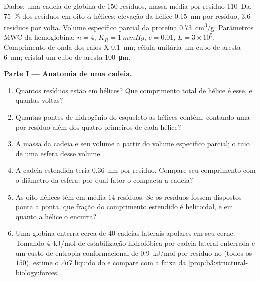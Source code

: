 \begin{problem}
\label{pb:b3:structural-biology:1}
Dados: uma cadeia de globina de $150$ resíduos, massa média por resíduo
\qty{110}{Da}, \qty{75}{\%} dos resíduos em oito $\alpha$-hélices;
elevação da hélice \qty{0.15}{nm} por resíduo, $3.6$ resíduos por
volta. Volume específico parcial da proteína \qty{0.73}{cm^3/g}.
Parâmetros MWC da hemoglobina: $n = 4$, $K_{R} = \qty{1}{mmHg}$,
$c = 0.01$, $L = 3\times 10^{5}$. Comprimento de onda dos raios X
\qty{0.1}{nm}; célula unitária um cubo de aresta \qty{6}{nm}; cristal
um cubo de aresta \qty{100}{\micro m}.

\medskip
\noindent\textbf{Parte I --- Anatomia de uma cadeia.}
\begin{enumerate}
  \item Quantos resíduos estão em hélices? Que comprimento total de
        hélice é esse, e quantas voltas?
  \item Quantas pontes de hidrogênio do esqueleto as hélices contêm,
        contando uma por resíduo além dos quatro primeiros de cada
        hélice?
  \item A massa da cadeia e seu volume a partir do volume específico
        parcial; o raio de uma esfera desse volume.
  \item A cadeia estendida teria \qty{0.36}{nm} por resíduo. Compare seu
        comprimento com o diâmetro da esfera: por qual fator o
         compacta a cadeia?
  \item As oito hélices têm em média $14$ resíduos. Se os resíduos
        fossem dispostos ponta a ponta, que fração do comprimento
        estendido é helicoidal, e em quanto a hélice o encurta?
  \item Uma globina enterra cerca de $40$ cadeias laterais apolares em
        seu cerne. Tomando \qty{4}{kJ/mol} de estabilização hidrofóbica
        por cadeia lateral enterrada e um custo de entropia
        conformacional de \qty{0.9}{kJ/mol} por resíduo no 
        (todos os $150$), estime o $\Delta G$ líquido do  e
        compare com a faixa da \cref{prop:b3:structural-biology:forces}.
\end{enumerate}


\end{problem}

